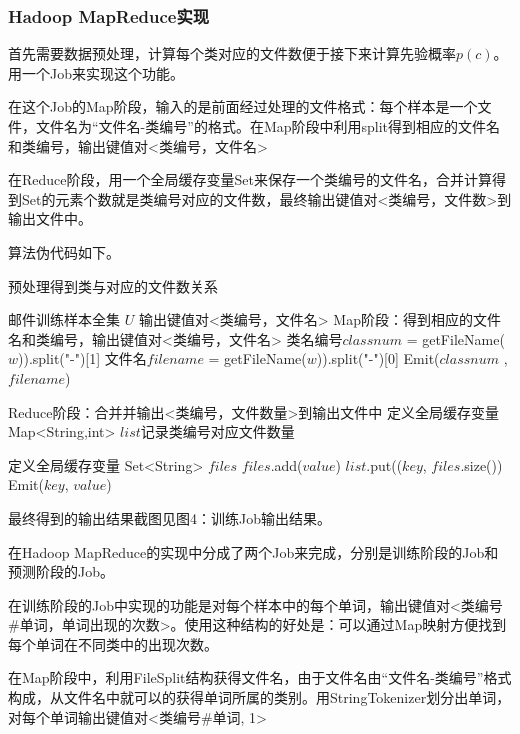 \documentclass[lang=cn,11pt]{elegantpaper}
\begin{document}
\subsubsection{Hadoop MapReduce实现}
首先需要数据预处理，计算每个类对应的文件数便于接下来计算先验概率$p(c)$。用一个Job来实现这个功能。

在这个Job的Map阶段，输入的是前面经过处理的文件格式：每个样本是一个文件，文件名为“文件名-类编号”的格式。在Map阶段中利用split得到相应的文件名和类编号，输出键值对<类编号，文件名>

在Reduce阶段，用一个全局缓存变量Set来保存一个类编号的文件名，合并计算得到Set的元素个数就是类编号对应的文件数，最终输出键值对<类编号，文件数>到输出文件中。

算法伪代码如下。
\begin{algorithm}[H]
  \caption{预处理得到类与对应的文件数关系}
  \label{alg:Framwork}
  \begin{algorithmic}[1]
    \Require
    邮件训练样本全集 $U$
    \Ensure
    输出键值对<类编号，文件名>
    \State Map阶段：得到相应的文件名和类编号，输出键值对<类编号，文件名>
        \State 类名编号$classnum$ = getFileName($w$)).split("-")[1]
		 \State 文件名$filename$ = getFileName($w$)).split("-")[0]
        \State Emit($classnum$ , $filename$)
      \EndFor
   \EndFunction

  \State Reduce阶段：合并并输出<类编号，文件数量>到输出文件中
  \State 定义全局缓存变量 Map<String,int> $list$记录类编号对应文件数量
  
    \State 定义全局缓存变量 Set<String> $files$
        \State $files$.add($value$)
    \EndFor
    \State $list$.put(($key$, $files$.size())
  \EndFunction
        \State Emit($key$, $value$)
    \EndFor
  \EndFunction
  \end{algorithmic}
\end{algorithm}

最终得到的输出结果截图见图4：训练Job输出结果。

在Hadoop MapReduce的实现中分成了两个Job来完成，分别是训练阶段的Job和预测阶段的Job。

在训练阶段的Job中实现的功能是对每个样本中的每个单词，输出键值对<类编号\#单词，单词出现的次数>。使用这种结构的好处是：可以通过Map映射方便找到每个单词在不同类中的出现次数。

在Map阶段中，利用FileSplit结构获得文件名，由于文件名由“文件名-类编号”格式构成，从文件名中就可以的获得单词所属的类别。用StringTokenizer划分出单词，对每个单词输出键值对<类编号\#单词, 1>
\end{document}
